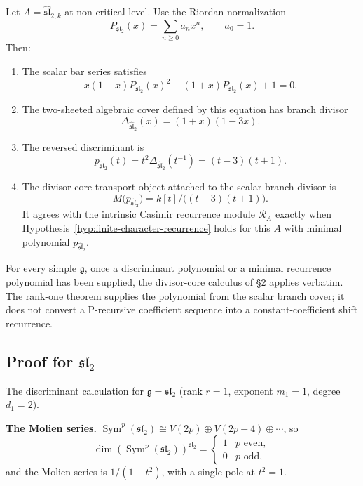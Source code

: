 \begin{theorem}
\label{thm:pbw-recurrence}
Let \(A=\widehat{\mathfrak{sl}}_{2,k}\) at non-critical level.
Use the Riordan normalization
\[
P_{\mathfrak{sl}_2}(x)=\sum_{n\ge 0}a_nx^n,\qquad a_0=1.
\]
Then:
\begin{enumerate}[label=\textup{(\alph*)}]
\item
The scalar bar series satisfies
\[
x(1{+}x)P_{\mathfrak{sl}_2}(x)^2-(1{+}x)P_{\mathfrak{sl}_2}(x)+1=0.
\]
\item
The two-sheeted algebraic cover defined by this equation has branch
divisor
\[
\Delta_{\widehat{\mathfrak{sl}}_2}(x)=(1{+}x)(1{-}3x).
\]
\item
The reversed discriminant is
\[
p_{\widehat{\mathfrak{sl}}_2}(t)
=t^2\Delta_{\widehat{\mathfrak{sl}}_2}(t^{-1})
=(t-3)(t+1).
\]
\item
The divisor-core transport object attached to the scalar branch divisor is
\[
M\bigl(p_{\widehat{\mathfrak{sl}}_2}\bigr)
=k[t]/\bigl((t-3)(t+1)\bigr).
\]
It agrees with the intrinsic Casimir recurrence module \(\mathcal R_A\)
exactly when Hypothesis~\ref{hyp:finite-character-recurrence} holds for
this \(A\) with minimal polynomial \(p_{\widehat{\mathfrak{sl}}_2}\).
\end{enumerate}
\end{theorem}

\begin{remark}
For every simple \(\mathfrak g\), once a discriminant polynomial or a
minimal recurrence polynomial has been supplied, the divisor-core
calculus of \S2 applies verbatim.
The rank-one theorem supplies the polynomial from the scalar branch cover;
it does not convert a P-recursive coefficient sequence into a constant-coefficient
shift recurrence.
\end{remark}

\subsection{Proof for \texorpdfstring{$\mathfrak{sl}_2$}{sl(2)}}
\label{subsec:pbw-recurrence-sl2}

The discriminant calculation for \(\mathfrak g=\mathfrak{sl}_2\)
(rank \(r=1\), exponent \(m_1=1\), degree \(d_1=2\)).

\medskip\noindent
\textbf{The Molien series.}
\(\operatorname{Sym}^p(\mathfrak{sl}_2)\cong
V(2p)\oplus V(2p-4)\oplus\cdots\),
so
\[
\dim(\operatorname{Sym}^p(\mathfrak{sl}_2))^{\mathfrak{sl}_2}
=\begin{cases}1&p\text{ even},\\0&p\text{ odd},\end{cases}
\]
and the Molien series is \(1/(1-t^2)\), with a single pole at
\(t^2=1\).

